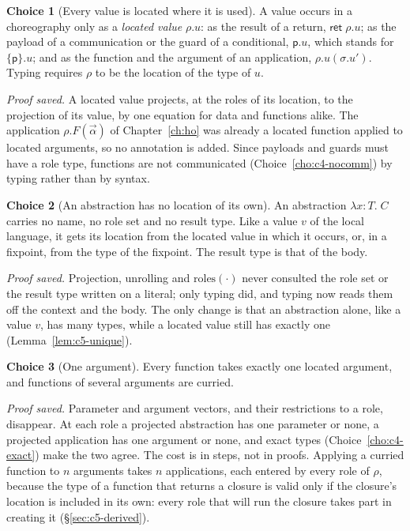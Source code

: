 \documentclass[11pt]{report}
\theoremstyle{plain}
\theoremstyle{definition}
\newtheorem{choice}{Choice}[chapter]
\theoremstyle{remark}
\newcommand{\kw}[1]{\mathsf{#1}}
\newcommand{\pp}{\mathsf{p}}
\newcommand{\cret}[1]{\kw{ret}\;#1}
\newcommand{\roles}[1]{\mathrm{roles}(#1)}
\newcommand{\clam}[3]{\lambda #1{:}#2.\;#3}
\begin{document}
\begin{choice}[Every value is located where it is used]\label{cho:c5-located}
  A value occurs in a choreography only as a \emph{located value} $\rho.u$:
  as the result of a return, $\cret{\rho.u}$; as the payload of a
  communication or the guard of a conditional, $\pp.u$, which stands for
  $\{\pp\}.u$; and as the function and the argument of an application,
  $\rho.u(\sigma.u')$.  Typing requires $\rho$ to be the location of the
  type of $u$.

  \emph{Proof saved.}  A located value projects, at the roles of its
  location, to the projection of its value, by one equation for data and
  functions alike.  The application $\rho.F(\vec\alpha)$ of
  Chapter~\ref{ch:ho} was already a located function applied to located
  arguments, so no annotation is added.  Since payloads and guards must have
  a role type, functions are not communicated (Choice~\ref{cho:c4-nocomm})
  by typing rather than by syntax.
\end{choice}

\begin{choice}[An abstraction has no location of its own]\label{cho:c5-lambda}
  An abstraction $\clam{x}{T}{C}$ carries no name, no role set and no result
  type.  Like a value $v$ of the local language, it gets its location from
  the located value in which it occurs, or, in a fixpoint, from the type of
  the fixpoint.  The result type is that of the body.

  \emph{Proof saved.}  Projection, unrolling and $\roles{\cdot}$ never
  consulted the role set or the result type written on a literal; only
  typing did, and typing now reads them off the context and the body.  The
  only change is that an abstraction alone, like a value $v$, has many
  types, while a located value still has exactly one
  (Lemma~\ref{lem:c5-unique}).
\end{choice}

\begin{choice}[One argument]\label{cho:c5-one}
  Every function takes exactly one located argument, and functions of
  several arguments are curried.

  \emph{Proof saved.}  Parameter and argument vectors, and their
  restrictions to a role, disappear.  At each role a projected abstraction
  has one parameter or none, a projected application has one argument or
  none, and exact types (Choice~\ref{cho:c4-exact}) make the two agree.  The
  cost is in steps, not in proofs.  Applying a curried function to $n$
  arguments takes $n$ applications, each entered by every role of $\rho$,
  because the type of a function that returns a closure is valid only if
  the closure's location is included in its own: every role that will run
  the closure takes part in creating it (\S\ref{sec:c5-derived}).
\end{choice}
\end{document}
